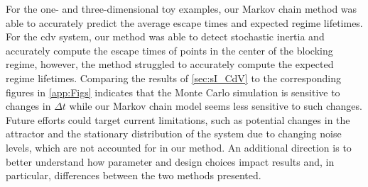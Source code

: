 For the one- and three-dimensional toy examples, our Markov chain method was able to accurately predict the average escape times and expected regime lifetimes. For the \gls{cdv} system, our method was able to detect stochastic inertia and accurately compute the escape times of points in the center of the blocking regime, however, the method struggled to accurately compute the expected regime lifetimes.
Comparing the results of \cref{sec:sI_CdV} to the corresponding figures in \cref{app:Figs} indicates that the Monte Carlo simulation is sensitive to changes in $\Delta t$ while our Markov chain model seems less sensitive to such changes. Future efforts could target current limitations, such as potential changes in the attractor and the stationary distribution of the system due to changing noise levels, which are not accounted for in our method. An additional direction is to better understand how parameter and design choices impact results and, in particular, differences between the two methods presented.

